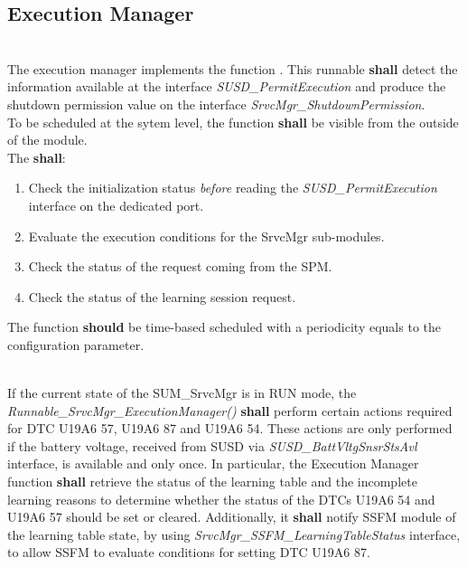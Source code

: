 \subsection{Execution Manager}
\label{sec:ExecManagerDynamic}
\\
The execution manager implements the function . 
This runnable \textbf{shall} detect the information available at the interface \textit{SUSD_PermitExecution} and  produce the shutdown permission value on the interface \textit{SrvcMgr_ShutdownPermission}.
\\
To be scheduled at the sytem level, the function  \textbf{shall} be visible from the outside of the module.
\\
The  \textbf{shall}:
\begin{enumerate}
    \item Check the initialization status \textit{before} reading the \textit{SUSD_PermitExecution} interface on the dedicated port.
    \item Evaluate the execution conditions for the SrvcMgr sub-modules.
	\item Check the status of the request coming from the SPM.
	\item Check the status of the learning session request.
\end{enumerate}

{     }


The function  \textbf{should} be time-based scheduled with a periodicity equals to the configuration parameter. 

{     }

\\
If the current state of the SUM\_SrvcMgr is in RUN mode, the \textit{Runnable_SrvcMgr_ExecutionManager()}  \textbf{shall} perform certain actions required for DTC  U19A6 57, U19A6 87 and U19A6 54.
These actions are only performed if the battery voltage, received from SUSD via \textit{SUSD_BattVltgSnsrStsAvl} interface, is available and only once. 
In particular, the Execution Manager function \textbf{shall} retrieve the status of the learning table and the incomplete learning reasons to determine whether 
the status of the DTCs U19A6 54 and U19A6 57 should be set or cleared. Additionally, it \textbf{shall} notify SSFM module of the learning table state, by using \textit{SrvcMgr_SSFM_LearningTableStatus} interface, 
to allow SSFM to evaluate conditions for setting DTC U19A6 87.

